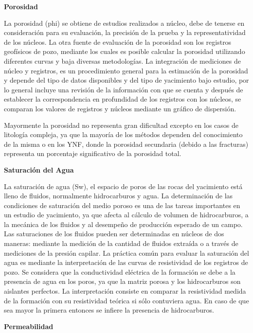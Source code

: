 \textbf{Porosidad}

La porosidad (phi) se obtiene de estudios realizados a n\'ucleo, debe de tenerse en consideraci\'on para su evaluaci\'on, la precisi\'on de la prueba y la representatividad de los n\'ucleos. La otra fuente de evaluaci\'on de la porosidad son los registros geof\'isicos de pozo, mediante los cuales es posible calcular la porosidad utilizando diferentes curvas y baja diversas metodolog\'ias. La integraci\'on de mediciones de n\'ucleo y registros, es un procedimiento general para la estimaci\'on de la porosidad y depende del tipo de datos disponibles y del tipo de yacimiento bajo estudio, por lo general incluye una revisi\'on de la informaci\'on con que se cuenta y despu\'es de establecer la correspondencia en profundidad de los registros con los n\'ucleos, se comparan los valores de registros y n\'ucleos mediante un gr\'afico de dispersi\'on.

Mayormente la porosidad no representa gran dificultad excepto en los casos de litolog\'ia compleja, ya que la mayor\'ia de los m\'etodos dependen del conocimiento de la misma o en los YNF, donde la porosidad  secundaria (debido a las fracturas) representa un porcentaje significativo de la porosidad total.

\textbf{Saturaci\'on del Agua}

La saturaci\'on de agua (Sw), el espacio de poros de las rocas del yacimiento est\'a lleno de fluidos, normalmente hidrocarburos y agua. La determinaci\'on de las condiciones de saturaci\'on del medio poroso es una de las tareas importantes en un estudio de yacimiento, ya que afecta al c\'alculo de volumen de hidrocarburos, a la mec\'anica de los fluidos y al desempe\~no de producci\'on esperado de un campo. Las saturaciones de los fluidos pueden ser determinadas en n\'ucleos de dos maneras: mediante la medici\'on de la cantidad de fluidos extra\'ida o a trav\'es de mediciones de la presi\'on capilar. La pr\'actica com\'un para evaluar la saturaci\'on del agua es mediante la interpretaci\'on de las curvas de resistividad de los registros de pozo. Se considera que  la conductividad el\'ectrica de la formaci\'on se debe a la presencia de agua en los poros, ya que la matriz porosa y los hidrocarburos son aislantes perfectos. La interpretaci\'on consiste en comparar la resistividad medida de la formaci\'on con su resistividad te\'orica si s\'olo contuviera agua. En caso de que sea mayor la primera entonces se infiere la presencia de hidrocarburos. 

\textbf{Permeabilidad}

